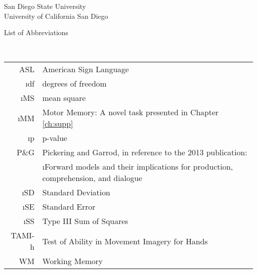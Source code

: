             \begin{center}
                \doublespacing
                San Diego State University \\
                University of California San Diego \\
                \the\year
            \end{center}
        \vfill
        \restoregeometry
        \pagebreak
        \begin{singlespace}
        \tableofcontents
        \thispagestyle{plain}
        \end{singlespace}
        \pagebreak
        \thispagestyle{plain}
        \centerline{List of Abbreviations}   
            \hfill\\ \hfill
            \begin{tabular}{rl} \centering
                ASL & American Sign Language \\
                \i{df} & degrees of freedom \\
                \i{MS} & mean square\\
                \i{MM} & Motor Memory: A novel task presented in Chapter \ref{ch:supp} \\
                \i{p} & p-value \\
                P\&G & Pickering and Garrod, in reference to the 2013 publication:\\
                   & \i{Forward models and their implications for production, comprehension, and dialogue} \\
                \i{SD} & Standard Deviation \\
                \i{SE} & Standard Error \\
                \i{SS} & Type III Sum of Squares \\
                TAMI-h & Test of Ability in Movement Imagery for Hands \\
                WM & Working Memory \\
            \end{tabular}
